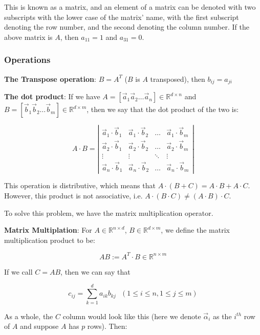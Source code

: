 \documentclass[11 pt, twoside]{article}
\begin{document}
This is known as a matrix, and an element of a matrix can be denoted with two
subscripts with the lower case of the matrix' name, with the first subscript denoting the row number, and the second denoting the
column number. If the above matrix is $A$, then $a_{11} = 1$ and $a_{31} = 0$.

\subsubsection{Operations}

\textbf{The Transpose operation}: $B = A^T$ ($B$ is $A$ transposed),
then $b_{ij} = a_{ji}$

\textbf{The dot product}: If we have $A = [\vec{a}_1 \vec{a}_2 \dots \vec{a}_n]
\in \mathbb{R}^{d \times n}$ and $B = [\vec{b}_1 \vec{b}_2 \dots \vec{b}_m]
\in \mathbb{R}^{d \times m}$, then we say that the dot product of the two is:

\[
    A \cdot B = \left|\begin{array}{cccc}
        \vec{a}_1 \cdot \vec{b}_1 & \vec{a}_1 \cdot \vec{b}_2 & \dots &
        \vec{a}_1 \cdot \vec{b}_m \\
        \vec{a}_2 \cdot \vec{b}_1 & \vec{a}_2 \cdot \vec{b}_2 & \dots &
        \vec{a}_2 \cdot \vec{b}_m \\
        \vdots & \vdots & \ddots & \vdots\\
        \vec{a}_n \cdot \vec{b}_1 & \vec{a}_n \cdot \vec{b}_2 & \dots &
        \vec{a}_n \cdot \vec{b}_m
                      \end{array}\right|
\]

This operation is distributive, which means that $A \cdot (B + C) = A \cdot B +
A \cdot C$. However, this product is not associative, i.e. $A \cdot (B \cdot C)
\neq (A \cdot B) \cdot C$.

To solve this problem, we have the matrix multiplication operator.

\textbf{Matrix Multiplation}: For $A \in \mathbb{R}^{n\times d}$, $B \in
\mathbb{R}^{d\times m}$, we define the matrix multiplication product to be:

$$\boxed{AB := A^T \cdot B} \in \mathbb{R}^{n\times m}$$

If we call $C = AB$, then we can say that

$$c_{ij} = \sum_{k = 1}^d a_{ik} b_{kj} \text{  } (1 \leq i \leq n, 1 \leq j
\leq m)$$

As a whole, the $C$ column would look like this (here we denote $\vec{\alpha}_i$
as the $i^{th}$ row of $A$ and suppose $A$ has $p$ rows). Then:
\end{document}
